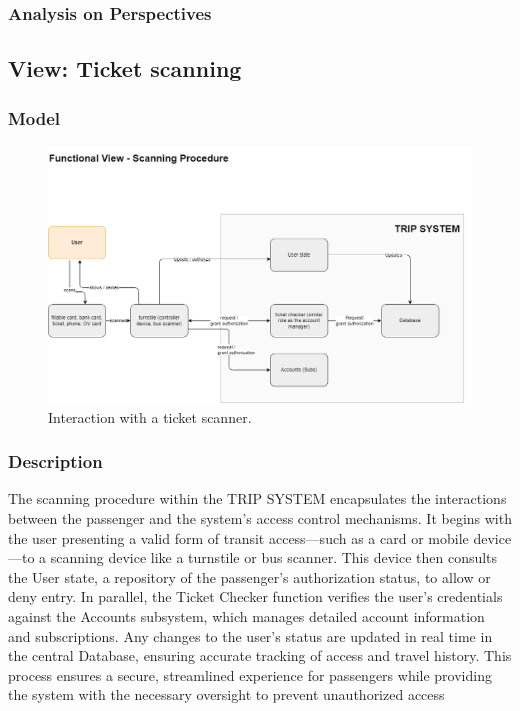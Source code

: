 \subsubsection{Analysis on Perspectives}

\subsection{View: Ticket scanning}
\subsubsection{Model}
\begin{figure}[H]
    \centering
    \includegraphics[width=\textwidth]{drawings/views_final_version/functional_view scanning.png}
    \caption{Interaction with a ticket scanner.}
    \label{fig:ticket_scanner}
\end{figure}

\subsubsection{Description}
The scanning procedure within the TRIP SYSTEM encapsulates the interactions between the passenger and the system's access control mechanisms. It begins with the user presenting a valid form of transit access—such as a card or mobile device—to a scanning device like a turnstile or bus scanner. This device then consults the User state, a repository of the passenger's authorization status, to allow or deny entry. In parallel, the Ticket Checker function verifies the user's credentials against the Accounts subsystem, which manages detailed account information and subscriptions. Any changes to the user's status are updated in real time in the central Database, ensuring accurate tracking of access and travel history. This process ensures a secure, streamlined experience for passengers while providing the system with the necessary oversight to prevent unauthorized access

